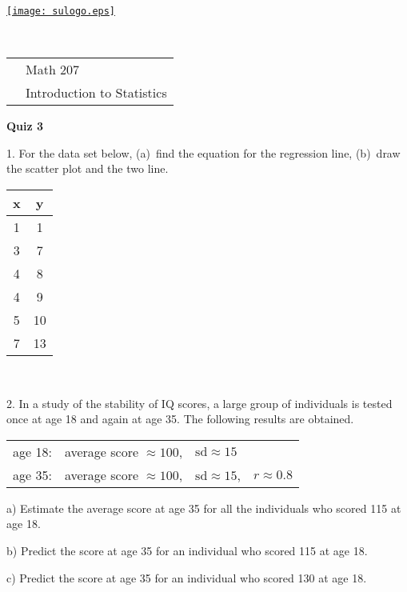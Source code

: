 \documentclass[10pt]{article}
\begin{document}
\pagestyle{empty}
\lstset{language=R, showspaces=false, showstringspaces=false}

\href{http://www.su.edu}{\texttt{[image: sulogo.eps]}}
\vspace{-1.69cm}

{{\ }\hfill\small
\begin{tabular}{cl}
& Math 207\\
& Introduction to Statistics\\
\end{tabular}
}
\setlength{\baselineskip}{1.05\baselineskip}
\bigskip

\begin{center}
\textbf{\large  Quiz 3}
\end{center}
\medskip

1. For the data set below, (a)~find the equation for the  regression line,
(b)~draw the scatter plot and the two line.\vspace{-15pt}
\begin{center}
\begin{tabular}{cc}
x & y\\ \hline
1 & 1\vphantom{\LARGE Y} \\
3 & 7\\
4 & 8\\
4 & 9\\
5 & 10\\
7 & 13
\end{tabular}
\end{center}

\vfill
\eject
{\ }\bigskip

2. In a study of the stability of IQ scores, a large group of individuals is
tested once at age 18 and again at age 35.  The following results are obtained.

\begin{center}
\begin{tabular}{llll}
age 18: & average score $\approx 100$, & $\mbox{sd}\approx 15$\\
age 35: & average score $\approx 100$, & $\mbox{sd}\approx 15$,  & $r\approx 0.8$\\
\end{tabular}
\end{center}

\hspace{20pt} a) Estimate the average score at age 35 for all the individuals who scored 115 at
 age 18.
\vspace{2in}

\hspace{20pt} b) Predict the score at age 35 for an individual who scored 115 at age 18.
\vspace{2in}

\hspace{20pt} c) Predict the score at age 35 for an individual who scored 130 at age 18.
\vfill
\eject
\end{document}
